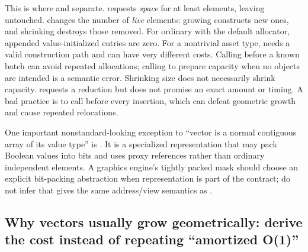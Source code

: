 This is where  and  separate.  requests \emph{space} for at least  elements, leaving  untouched.  changes the number of \emph{live} elements: growing constructs new ones, and shrinking destroys those removed. For ordinary  with the default allocator, appended value-initialized entries are zero. For a nontrivial asset type,  needs a valid construction path and can have very different costs. Calling  before a known batch can avoid repeated allocations; calling  to prepare capacity when no objects are intended is a semantic error. Shrinking size does not necessarily shrink capacity.  requests a reduction but does not promise an exact amount or timing. A bad practice is to call  before every insertion, which can defeat geometric growth and cause repeated relocations.

One important nonstandard-looking exception to ``vector is a normal contiguous array of its value type'' is . It is a specialized representation that may pack Boolean values into bits and uses proxy references rather than ordinary independent  elements. A graphics engine's tightly packed mask should choose an explicit bit-packing abstraction when representation is part of the contract; do not infer that  gives the same address/view semantics as .

\subsection{Why vectors usually grow geometrically: derive the cost instead of repeating ``amortized O(1)''}\label{01-foundations-i-ch006-why-vectors-usually-grow-geometrically-derive-the-cost-instead-of-repeating-amortized-o1}

